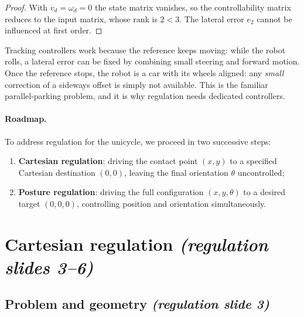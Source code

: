 \documentclass[11pt,a4paper]{article}
\theoremstyle{definition}
\theoremstyle{plain}
\theoremstyle{remark}
\begin{document}
\begin{proof}
With $v_d=\omega_d=0$ the state matrix vanishes, so the controllability matrix reduces to the input matrix, whose rank is $2<3$. The lateral error $e_2$ cannot be influenced at first order.
\end{proof}

\begin{intuition}
Tracking controllers work because the reference keeps moving: while the robot rolls, a lateral error can be fixed by combining small steering and forward motion. Once the reference stops, the robot is a car with its wheels aligned: any \emph{small} correction of a sideways offset is simply not available. This is the familiar parallel-parking problem, and it is why regulation needs dedicated controllers.
\end{intuition}

\paragraph{Roadmap.}
To address regulation for the unicycle, we proceed in two successive steps:
\begin{enumerate}[leftmargin=*,nosep]
\item \textbf{Cartesian regulation}: driving the contact point $(x,y)$ to a specified Cartesian destination $(0,0)$, leaving the final orientation $\theta$ uncontrolled;
\item \textbf{Posture regulation}: driving the full configuration $(x,y,\theta)$ to a desired target $(0,0,0)$, controlling position and orientation simultaneously.
\end{enumerate}

\section{Cartesian regulation \emph{(regulation slides 3--6)}}

\subsection{Problem and geometry \emph{(regulation slide 3)}}
\end{document}
